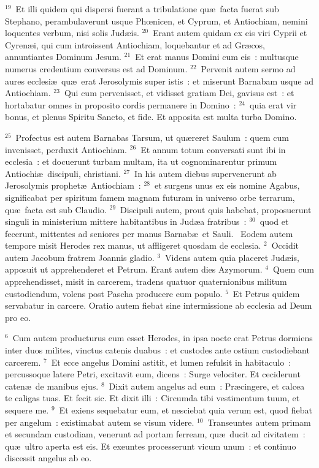 ${}^{19}$~Et illi quidem qui dispersi fuerant a tribulatione qu\ae\ facta fuerat sub Stephano, perambulaverunt usque Phœnicen, et Cyprum, et Antiochiam, nemini loquentes verbum, nisi solis Jud\ae is.
${}^{20}$~Erant autem quidam ex eis viri Cyprii et Cyren\ae i, qui cum introissent Antiochiam, loquebantur et ad Gr\ae cos, annuntiantes Dominum Jesum.
${}^{21}$~Et erat manus Domini cum eis~: multusque numerus credentium conversus est ad Dominum.
${}^{22}$~Pervenit autem sermo ad aures ecclesi\ae\ qu\ae\ erat Jerosolymis super istis~: et miserunt Barnabam usque ad Antiochiam.
${}^{23}$~Qui cum pervenisset, et vidisset gratiam Dei, gavisus est~: et hortabatur omnes in proposito cordis permanere in Domino~:
${}^{24}$~quia erat vir bonus, et plenus Spiritu Sancto, et fide. Et apposita est multa turba Domino.


${}^{25}$~Profectus est autem Barnabas Tarsum, ut qu\ae reret Saulum~: quem cum invenisset, perduxit Antiochiam.
${}^{26}$~Et annum totum conversati sunt ibi in ecclesia~: et docuerunt turbam multam, ita ut cognominarentur primum Antiochi\ae\ discipuli, christiani.
${}^{27}$~In his autem diebus supervenerunt ab Jerosolymis prophet\ae\ Antiochiam~:
${}^{28}$~et surgens unus ex eis nomine Agabus, significabat per spiritum famem magnam futuram in universo orbe terrarum, qu\ae\ facta est sub Claudio.
${}^{29}$~Discipuli autem, prout quis habebat, proposuerunt singuli in ministerium mittere habitantibus in Jud\ae a fratribus~:
${}^{30}$~quod et fecerunt, mittentes ad seniores per manus Barnab\ae\ et Sauli.
~\lettrine[lines=10,image=true,loversize=0.05,lraise=-0.03]{E}{}odem autem tempore misit Herodes rex manus, ut affligeret quosdam de ecclesia.
${}^{2}$~Occidit autem Jacobum fratrem Joannis gladio.
${}^{3}$~Videns autem quia placeret Jud\ae is, apposuit ut apprehenderet et Petrum. Erant autem dies Azymorum.
${}^{4}$~Quem cum apprehendisset, misit in carcerem, tradens quatuor quaternionibus militum custodiendum, volens post Pascha producere eum populo.
${}^{5}$~Et Petrus quidem servabatur in carcere. Oratio autem fiebat sine intermissione ab ecclesia ad Deum pro eo.


${}^{6}$~Cum autem producturus eum esset Herodes, in ipsa nocte erat Petrus dormiens inter duos milites, vinctus catenis duabus~: et custodes ante ostium custodiebant carcerem.
${}^{7}$~Et ecce angelus Domini astitit, et lumen refulsit in habitaculo~: percussoque latere Petri, excitavit eum, dicens~: Surge velociter. Et ceciderunt caten\ae\ de manibus ejus.
${}^{8}$~Dixit autem angelus ad eum~: Pr\ae cingere, et calcea te caligas tuas. Et fecit sic. Et dixit illi~: Circumda tibi vestimentum tuum, et sequere me.
${}^{9}$~Et exiens sequebatur eum, et nesciebat quia verum est, quod fiebat per angelum~: existimabat autem se visum videre.
${}^{10}$~Transeuntes autem primam et secundam custodiam, venerunt ad portam ferream, qu\ae\ ducit ad civitatem~: qu\ae\ ultro aperta est eis. Et exeuntes processerunt vicum unum~: et continuo discessit angelus ab eo.



